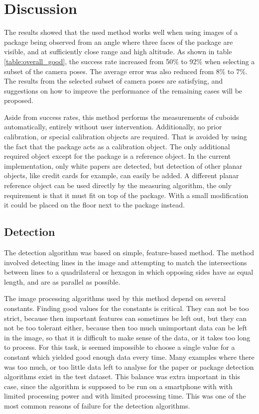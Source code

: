 \chapter{Discussion}
The results showed that the used method works well when using images of a package being observed from an angle where three faces of the package are visible, and at sufficiently close range and high altitude. 
As shown in table \ref{table:overall_good}, the success rate increased from 50\% to 92\% when selecting a subset of the camera poses.
The average error was also reduced from 8\% to 7\%.
The results from the selected subset of camera poses are satisfying, and suggestions on how to improve the performance of the remaining cases will be proposed.

Aside from success rates, this method performs the measurements of cuboids automatically, entirely without user intervention.
Additionally, no prior calibration, or special calibration objects are required.
That is avoided by using the fact that the package acts as a calibration object.
The only additional required object except for the package is a reference object.
In the current implementation, only white papers are detected, but detection of other planar objects, like credit cards for example, can easily be added.
A different planar reference object can be used directly by the measuring algorithm, the only requirement is that it must fit on top of the package.
With a small modification it could be placed on the floor next to the package instead.

\section{Detection} \label{discussion:detection}
The detection algorithm was based on simple, feature-based method. 
The method involved detecting lines in the image and attempting to match the intersections between lines to a quadrilateral or hexagon in which opposing sides have as equal length, and are as parallel as possible.

The image processing algorithms used by this method depend on several constants.
Finding good values for the constants is critical.
They can not be too strict, because then important features can sometimes be left out, but they can not be too tolerant either, because then too much unimportant data can be left in the image, so that it is difficult to make sense of the data, or it takes too long to process.
For this task, is seemed impossible to choose a single value for a constant which yielded good enough data every time.
Many examples where there was too much, or too little data left to analyse for the paper or package detection algorithms exist in the test dataset.
This balance was extra important in this case, since the algorithm is supposed to be run on a smartphone with with limited processing power and with limited processing time.
This was one of the most common reasons of failure for the detection algorithms.

